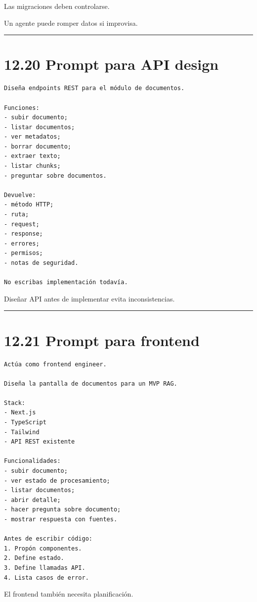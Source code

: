 Las migraciones deben controlarse.

Un agente puede romper datos si improvisa.

\begin{center}\rule{0.5\linewidth}{0.5pt}\end{center}

\section{12.20 Prompt para API design}\label{prompt-para-api-design}

\begin{lstlisting}
Diseña endpoints REST para el módulo de documentos.

Funciones:
- subir documento;
- listar documentos;
- ver metadatos;
- borrar documento;
- extraer texto;
- listar chunks;
- preguntar sobre documentos.

Devuelve:
- método HTTP;
- ruta;
- request;
- response;
- errores;
- permisos;
- notas de seguridad.

No escribas implementación todavía.
\end{lstlisting}

Diseñar API antes de implementar evita inconsistencias.

\begin{center}\rule{0.5\linewidth}{0.5pt}\end{center}

\section{12.21 Prompt para frontend}\label{prompt-para-frontend}

\begin{lstlisting}
Actúa como frontend engineer.

Diseña la pantalla de documentos para un MVP RAG.

Stack:
- Next.js
- TypeScript
- Tailwind
- API REST existente

Funcionalidades:
- subir documento;
- ver estado de procesamiento;
- listar documentos;
- abrir detalle;
- hacer pregunta sobre documento;
- mostrar respuesta con fuentes.

Antes de escribir código:
1. Propón componentes.
2. Define estado.
3. Define llamadas API.
4. Lista casos de error.
\end{lstlisting}

El frontend también necesita planificación.

